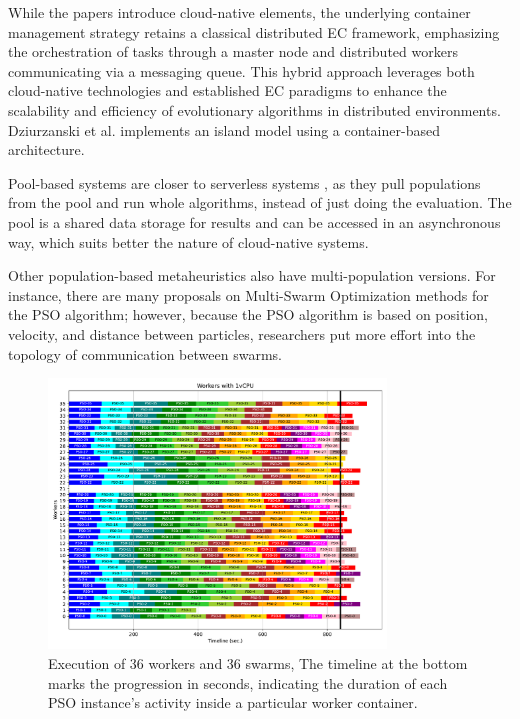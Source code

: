 \documentclass{cys}
\begin{document}
While the papers introduce cloud-native elements, the underlying container 
management strategy retains a classical distributed EC framework, 
emphasizing the orchestration of tasks through a master node and 
distributed workers communicating via a messaging queue. This hybrid 
approach leverages both cloud-native technologies and established EC 
paradigms to enhance the scalability and efficiency of evolutionary 
algorithms in distributed environments. Dziurzanski et al.
\cite{dziurzanski2020scalable} implements an island model using a container-based
architecture.

Pool-based systems \cite{merelo2012sofea,sofea:cec2012} are closer to serverless systems
\cite{malawski2017serverless}, as they pull populations from the pool and run
whole algorithms, instead of just doing the evaluation. The pool 
is a shared data storage for results and can be accessed in an
asynchronous way, which suits better the nature of cloud-native systems.

Other population-based metaheuristics also have multi-population versions.  For
instance, there are many proposals on Multi-Swarm Optimization methods
\cite{ma2019multi} for the PSO algorithm; however, because the PSO algorithm is
based on position, velocity, and distance between particles, researchers put
more effort into the topology of communication between swarms. 

\begin{figure}[ht]
\centering
\includegraphics[width=0.8\textwidth]{plotW36P36}
\caption{Execution of 36 workers and 36 swarms, The timeline at the bottom marks 
the progression in seconds, indicating the duration of each PSO instance's activity 
inside a particular worker container.}
\label{fig:36w36s}
\end{figure}
\end{document}
